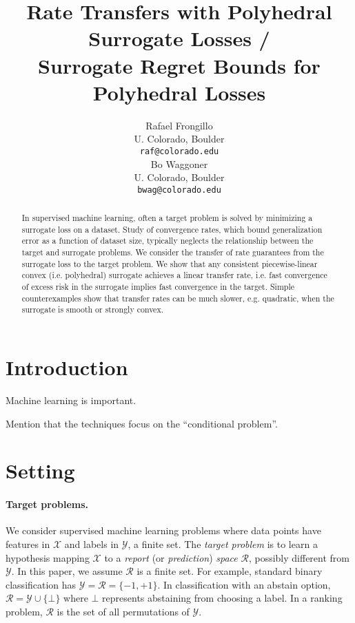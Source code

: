 \documentclass{article}
\title{Rate Transfers with Polyhedral Surrogate Losses /\\
  Surrogate Regret Bounds for Polyhedral Losses}
\author{%
  Rafael Frongillo \\
  U. Colorado, Boulder \\
  \texttt{raf@colorado.edu} \\
  \And
  Bo Waggoner \\
  U. Colorado, Boulder \\
  \texttt{bwag@colorado.edu}
}
\newcommand{\R}{\mathcal{R}}
\newcommand{\X}{\mathcal{X}}
\newcommand{\Y}{\mathcal{Y}}
\begin{document}
\maketitle

\begin{abstract}
  In supervised machine learning, often a target problem is solved by minimizing a surrogate loss on a dataset.
  Study of convergence rates, which bound generalization error as a function of dataset size, typically neglects the relationship between the target and surrogate problems.
  We consider the transfer of rate guarantees from the surrogate loss to the target problem.
  We show that any consistent piecewise-linear convex (i.e. polyhedral) surrogate achieves a linear transfer rate, i.e. fast convergence of excess risk in the surrogate implies fast convergence in the target.
  Simple counterexamples show that transfer rates can be much slower, e.g. quadratic, when the surrogate is smooth or strongly convex.
\end{abstract}



\section{Introduction}

Machine learning is important.

Mention that the techniques focus on the ``conditional problem''.


\section{Setting}

\paragraph{Target problems.}
We consider supervised machine learning problems where data points have features in $\X$ and labels in $\Y$, a finite set.
The \emph{target problem} is to learn a hypothesis mapping $\X$ to a \emph{report} (or \emph{prediction}) \emph{space} $\R$, possibly different from $\Y$.
In this paper, we assume $\R$ is a finite set.
For example, standard binary classification has $\Y = \R = \{-1,+1\}$.
In classification with an abstain option, $\R = \Y \cup \{\bot\}$ where $\bot$ represents abstaining from choosing a label.
In a ranking problem, $\R$ is the set of all permutations of $\Y$.
\end{document}
